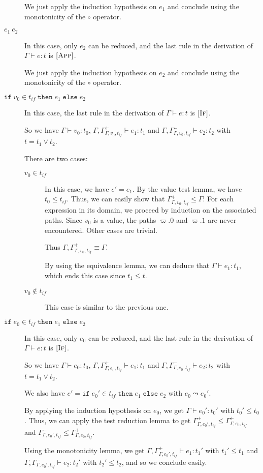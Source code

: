 \documentclass[a4paper]{article}%
\newcommand{\ite}[4]{\ensuremath{\texttt{if}\;#1\in#2\;\texttt{then}\;#3\;\texttt{else}\;#4}}
\theoremstyle{definition}
\newcommand {\Rule}[1] {[\textsc{#1}]}
\begin{document}
\begin{description}
      We just apply the induction hypothesis on $e_1$ and conclude using the monotonicity of the $\circ$ operator.
      \item[$e_1\ e_2$] In this case, only $e_2$ can be reduced, and the last rule in the derivation of $\Gamma \vdash e:t$ is $\Rule{App}$.

      We just apply the induction hypothesis on $e_2$ and conclude using the monotonicity of the $\circ$ operator.
      \item[$\ite {v_0} {t_{if}} {e_1} {e_2}$] In this case, the last rule in the derivation of $\Gamma \vdash e:t$ is $\Rule{If}$.
       
      So we have $\Gamma \vdash v_0 : t_0$, $\Gamma, \Gamma^+_{\Gamma,v_0,t_{if}}\vdash e_1 : t_1$ and $\Gamma, \Gamma^-_{\Gamma,v_0,t_{if}}\vdash e_2 : t_2$ with $t=t_1\vee t_2$.

      There are two cases:
      \begin{description}
        \item[$v_0 \in t_{if}$] In this case, we have $e'=e_1$.
        By the value test lemma, we have $t_0 \leq t_{if}$.
        Thus, we can easily show that $\Gamma^+_{\Gamma,v_0,t_{if}} \leq \Gamma$:
        For each expression in its domain, we proceed by induction on the associated paths.
        Since $v_0$ is a value, the paths $\varpi.0$ and $\varpi.1$ are never encountered. Other cases are trivial.

        Thus $\Gamma, \Gamma^+_{\Gamma,v_0,t_{if}} \equiv \Gamma$.

        By using the equivalence lemma, we can deduce that $\Gamma \vdash e_1 : t_1$, which ends this case since $t_1 \leq t$.
        \item[$v_0 \not\in t_{if}$] This case is similar to the previous one.
      \end{description}
        
      \item[$\ite {e_0} {t_{if}} {e_1} {e_2}$] In this case, only $e_0$ can be reduced, and the last rule in the derivation of $\Gamma \vdash e:t$ is $\Rule{If}$.
      
      So we have $\Gamma \vdash e_0 : t_0$, $\Gamma, \Gamma^+_{\Gamma,e_0,t_{if}}\vdash e_1 : t_1$ and $\Gamma, \Gamma^-_{\Gamma,e_0,t_{if}}\vdash e_2 : t_2$ with $t=t_1\vee t_2$.
      
      We also have $e'=\ite {e_0'} {t_{if}} {e_1} {e_2}$ with $e_0\leadsto e_0'$.

      By applying the induction hypothesis on $e_0$, we get $\Gamma \vdash e_0':t_0'$ with $t_0' \leq t_0$.
      Thus, we can apply the test reduction lemma to get $\Gamma^+_{\Gamma,e_0',t_{if}} \leq \Gamma^+_{\Gamma,e_0,t_{if}}$ and
      $\Gamma^-_{\Gamma,e_0',t_{if}} \leq \Gamma^+_{\Gamma,e_0,t_{if}}$.

      Using the monotonicity lemma, we get $\Gamma, \Gamma^+_{\Gamma,e_0',t_{if}}\vdash e_1 : t_1'$ with $t_1'\leq t_1$
      and $\Gamma, \Gamma^-_{\Gamma,e_0',t_{if}}\vdash e_2 : t_2'$ with $t_2'\leq t_2$, and so we conclude easily.
    \end{description}
\end{document}
